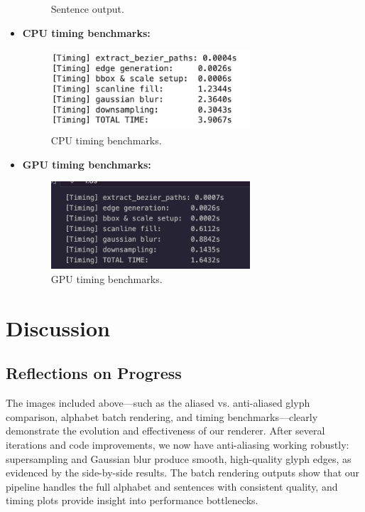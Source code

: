 \documentclass[11pt]{article}
\begin{document}
\begin{itemize}[leftmargin=*,nosep]
\begin{figure}[h]
        \caption{Sentence output.}
    \end{figure}
    \item \textbf{CPU timing benchmarks:}
    \begin{figure}[h]
        \centering
        \includegraphics[width=0.7\textwidth]{../images/CPUTimeBenchmark.jpeg}
        \caption{CPU timing benchmarks.}
    \end{figure}
    \item \textbf{GPU timing benchmarks:}
    \begin{figure}[h]
        \centering
        \includegraphics[width=0.7\textwidth]{../images/GPUTimeBenchmark.jpeg}
        \caption{GPU timing benchmarks.}
    \end{figure}
\end{itemize}
\par

\section{Discussion}

\subsection{Reflections on Progress}
The images included above---such as the aliased vs. anti-aliased glyph comparison, alphabet batch rendering, and timing benchmarks---clearly demonstrate the evolution and effectiveness of our renderer. After several iterations and code improvements, we now have anti-aliasing working robustly: supersampling and Gaussian blur produce smooth, high-quality glyph edges, as evidenced by the side-by-side results. The batch rendering outputs show that our pipeline handles the full alphabet and sentences with consistent quality, and timing plots provide insight into performance bottlenecks. \\
\end{document}
